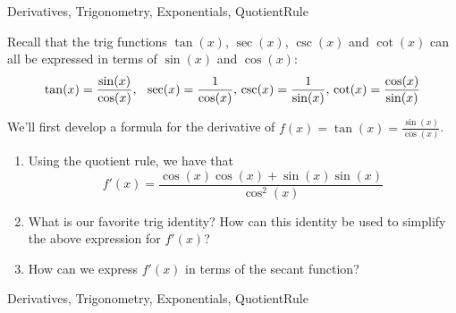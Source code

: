 \begin{tagblock}{Derivatives, Trigonometry, Exponentials, QuotientRule}
\begin{question}
	






Recall that the trig functions $\tan(x)$, $\sec(x)$, $\csc(x)$ and $\cot(x)$ can all be expressed in terms of $\sin(x)$ and $\cos(x)$:
\[ \tan(x) = \frac{\sin(x)}{\cos(x)}, \hspace{.1in} \sec (x) = \frac{1}{\cos(x)}, \, \csc (x) = \frac{1}{\sin(x)}, \, \cot (x) = \frac{\cos(x)}{\sin(x)}\]



   We'll first develop a formula for the derivative of $f(x) = \tan(x) = \frac{\sin(x)}{\cos(x)}$.
\begin{enumerate}


\item Using the quotient rule, we have that
\[f'(x) = \frac{\cos(x) \cos(x) + \sin(x) \sin(x)}{\cos^2(x)}\]

\vspace{1in}

\item What is our favorite trig identity? How can this identity be used to simplify the above expression for $f'(x)$?

\vspace{1.2in} 
\item How can we express $f'(x)$ in terms of the secant function?
\end{enumerate}







	









	
	
\begin{tags}
	    Derivatives, Trigonometry, Exponentials, QuotientRule
\end{tags}
	
\begin{diary}
\end{diary}
	
\begin{solution}
	   
\end{solution}
	
\end{question}

\end{tagblock}

